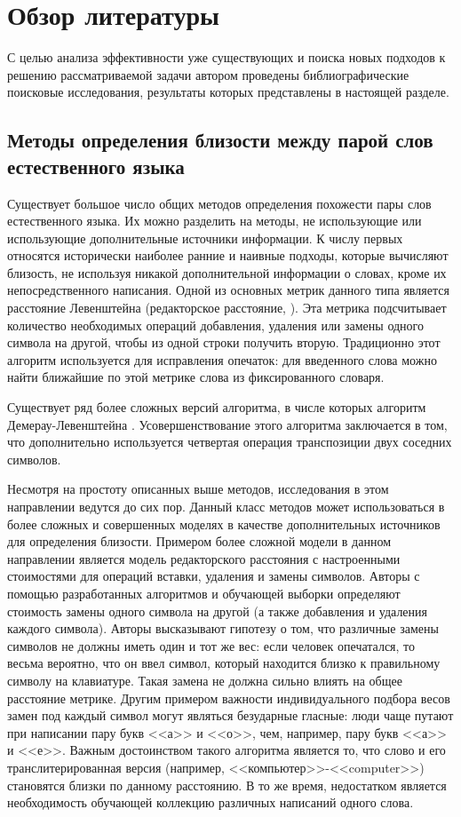 \chapter{Обзор литературы} \label{chapt1}

С целью анализа эффективности уже существующих и поиска новых подходов к решению рассматриваемой задачи автором проведены библиографические поисковые исследования, результаты которых представлены в настоящей разделе. 

\section{Методы определения близости между парой слов естественного языка}


Существует большое число общих методов определения похожести пары слов естественного языка. Их можно разделить на методы, не использующие или использующие дополнительные источники информации. К числу первых относятся исторически наиболее ранние и наивные подходы, которые вычисляют близость, не используя никакой дополнительной информации о словах, кроме их непосредственного написания. Одной из основных метрик данного типа является расстояние Левенштейна  (редакторское расстояние, \cite{leven}). Эта метрика подсчитывает количество необходимых операций добавления, удаления или замены одного символа на другой, чтобы из одной строки получить вторую. Традиционно этот алгоритм используется для исправления опечаток: для введенного слова можно найти ближайшие по этой метрике слова из фиксированного словаря. 

Существует ряд более сложных версий алгоритма, в числе которых алгоритм Демерау-Левенштейна \cite{leven_dem}. Усовершенствование этого алгоритма заключается в том, что дополнительно используется четвертая операция транспозиции двух соседних символов.

Несмотря на простоту описанных выше методов, исследования в этом направлении ведутся до сих пор. Данный класс методов может использоваться в более сложных и совершенных моделях в качестве дополнительных источников для определения близости. Примером более сложной модели в данном направлении является модель редакторского расстояния с настроенными стоимостями для операций вставки, удаления и замены символов.
Авторы \cite{learn_leven} с помощью разработанных алгоритмов и обучающей выборки определяют стоимость замены одного символа на другой (а также добавления и удаления каждого символа). Авторы высказывают гипотезу о том, что различные замены символов не должны иметь один и тот же вес: если человек опечатался, то весьма вероятно, что он ввел символ, который находится близко к правильному символу на клавиатуре. Такая замена не должна сильно влиять на общее расстояние метрике. Другим примером важности индивидуального подбора весов замен под каждый символ могут являться безударные гласные: люди чаще путают при написании пару букв <<а>> и <<о>>, чем, например, пару букв <<а>> и <<е>>. Важным достоинством такого алгоритма является то, что слово и его транслитерированная версия (например, <<компьютер>>-<<computer>>) становятся близки по данному расстоянию. В то же время, недостатком является необходимость обучающей коллекцию различных написаний одного слова.

